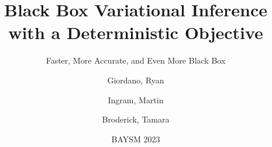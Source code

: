 \documentclass[8pt]{beamer}\usepackage[]{graphicx}\usepackage[]{color}
\begin{document}

\title{Black Box Variational Inference\\\hspace{1em}with a Deterministic Objective}

\subtitle{Faster, More Accurate, and Even More Black Box} 
\date{BAYSM 2023}

\author{Giordano, Ryan  \and Ingram, Martin \and Broderick, Tamara}



\frame{\titlepage}

\end{document}
